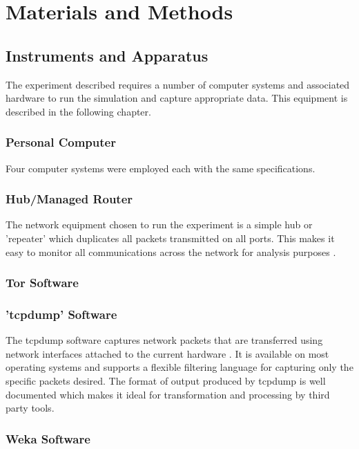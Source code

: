 
\chapter{Materials and Methods}

\section{Instruments and Apparatus}

The experiment described requires a number of computer systems and associated hardware to run the simulation and capture appropriate data. This equipment is described in the following chapter.

\subsection{Personal Computer}

Four computer systems were employed each with the same specifications.

\subsection{Hub/Managed Router}

The network equipment chosen to run the experiment is a simple hub or
'repeater' which duplicates all packets transmitted on all ports. This makes it
easy to monitor all communications across the network for analysis purposes
\parencite{website:hub-reference}.

\subsection{Tor Software}


\subsection{'tcpdump' Software}

The tcpdump software captures network packets that are transferred using
network interfaces attached to the current hardware \parencite{:2009cr}.  It is
available on most operating systems and supports a flexible filtering language
for capturing only the specific packets desired. The format of output produced
by tcpdump is well documented \parencite{:nx} which makes it ideal for
transformation and processing by third party tools.

\subsection{Weka Software}

